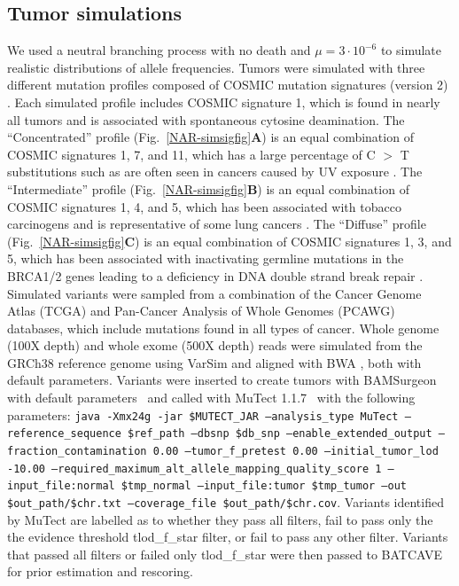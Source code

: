 \documentclass[a4,center,fleqn]{NAR}
\newcommand{\batcave}{BATCAVE\xspace}
\begin{document}
\subsection{Tumor simulations}
We used a neutral branching process with no death and $\mu=3\cdot10^{-6}$ to simulate realistic distributions of allele frequencies.
Tumors were simulated with three different mutation profiles composed of COSMIC mutation signatures (version 2) \cite{Cosmic_consortium}.
Each simulated profile includes COSMIC signature 1, which is found in nearly all tumors and is associated with spontaneous cytosine deamination.
The ``Concentrated'' profile (Fig.~\ref{NAR-simsigfig}\textbf{A}) is an equal combination of COSMIC signatures 1, 7, and 11, which has a large percentage of C $>$ T substitutions such as are often seen in cancers caused by UV exposure \cite{Alexandrov2013}.
The ``Intermediate'' profile (Fig.~\ref{NAR-simsigfig}\textbf{B}) is an equal combination of COSMIC signatures 1, 4, and 5, which has been associated with tobacco carcinogens and is representative of some lung cancers \cite{Alexandrov2013}.
The ``Diffuse'' profile (Fig.~\ref{NAR-simsigfig}\textbf{C}) is an equal combination of COSMIC signatures 1, 3, and 5, which has been associated with inactivating germline mutations in the BRCA1/2 genes leading to a deficiency in DNA double strand break repair \cite{Nik-Zainal2016}.
Simulated variants were sampled from a combination of the Cancer Genome Atlas (TCGA) and Pan-Cancer Analysis of Whole Genomes (PCAWG) databases, which include mutations found in all types of cancer.
Whole genome (100X depth) and whole exome (500X depth) reads were simulated from the GRCh38 reference genome using VarSim \cite{Mu2015} and aligned with BWA \cite{Li2009a}, both with default parameters.
Variants were inserted to create tumors with BAMSurgeon with default parameters~\citep{Ewing2015a} and called with MuTect 1.1.7~\cite{Cibulskis2013} with the following parameters:
\texttt{\small java -Xmx24g -jar \$MUTECT\_JAR --analysis\_type MuTect 
        --reference\_sequence \$ref\_path 
        --dbsnp \$db\_snp 
        --enable\_extended\_output 
        --fraction\_contamination 0.00 
        --tumor\_f\_pretest 0.00 
        --initial\_tumor\_lod -10.00 
        --required\_maximum\_alt\_allele\_mapping\_quality\_score 1 
        --input\_file:normal \$tmp\_normal 
        --input\_file:tumor \$tmp\_tumor 
        --out \$out\_path/\$chr.txt 
        --coverage\_file \$out\_path/\$chr.cov}.
Variants identified by MuTect are labelled as to whether they pass all filters, fail to pass only the the evidence threshold \textrm{tlod\_f\_star} filter, or fail to pass any other filter. 
Variants that passed all filters or failed only \textrm{tlod\_f\_star} were then passed to \batcave for prior estimation and rescoring.
\end{document}
